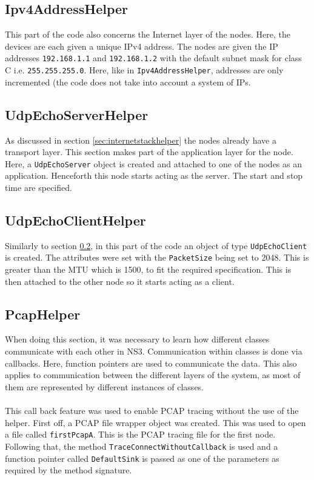 \documentclass[a4paper, 12pt]{article}
\begin{document}
\subsection{Ipv4AddressHelper}
This part of the code also concerns the Internet layer of the nodes. Here, the devices are each given a unique IPv4 address. The nodes are given the IP addresses \texttt{192.168.1.1} and \texttt{192.168.1.2} with the default subnet mask for class C i.e. \texttt{255.255.255.0}. Here, like in \texttt{Ipv4AddressHelper}, addresses are only incremented (the code does not take into account a system of IPs.

\subsection{UdpEchoServerHelper}
\label{sec:udpechoserverhelper}

As discussed in section \ref{sec:internetstackhelper} the nodes already have a transport layer. This section makes part of the application layer for the node. Here, a \texttt{UdpEchoServer} object is created and attached to one of the nodes as an application. Henceforth this node starts acting as the server. The start and stop time are specified.

\subsection{UdpEchoClientHelper}
Similarly to section \ref{sec:udpechoserverhelper}, in this part of the code an object of type \texttt{UdpEchoClient} is created. The attributes were set with the \texttt{PacketSize} being set to 2048. This is greater than the MTU which is 1500, to fit the required specification. This is then attached to the other node so it starts acting as a client. 
 	
 
\subsection{PcapHelper} 
\label{sec:pcaphelper}
When doing this section, it was necessary to learn how different classes communicate with each other in NS3. Communication within classes is done via callbacks. Here, function pointers are used to communicate the data. This also applies to communication between the different layers of the system, as most of them are represented by different instances of classes.

\paragraph{}
This call back feature was used to enable PCAP tracing without the use of the helper. First off, a PCAP file wrapper object was created. This was used to open a file called \texttt{firstPcapA}. This is the PCAP tracing file for the first node.
Following that, the method \texttt{TraceConnectWithoutCallback} is used and a function pointer called \texttt{DefaultSink} is passed as one of the parameters as required by the method signature. 
\end{document}
